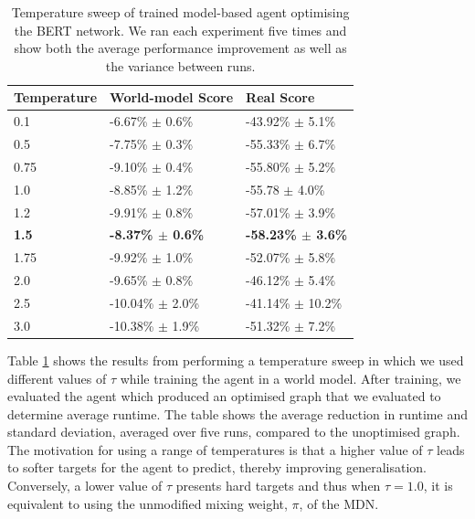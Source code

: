\begin{table}[htbp]
  \centering
  \begin{tabular}{@{}lll@{}}
  \toprule
  Temperature  & World-model Score        & Real Score                \\ \midrule
  0.1          & -6.67\% $\pm$ 0.6\%          & -43.92\% $\pm$ 5.1\%         \\
  0.5          & -7.75\% $\pm$ 0.3\%          & -55.33\% $\pm$ 6.7\%         \\
  0.75         & -9.10\% $\pm$ 0.4\%          & -55.80\% $\pm$ 5.2\%         \\
  1.0          & -8.85\% $\pm$ 1.2\%          & -55.78 $\pm$ 4.0\%           \\
  1.2          & -9.91\% $\pm$ 0.8\%          & -57.01\% $\pm$ 3.9\%         \\
  \textbf{1.5} & \textbf{-8.37\% $\mathbf{\pm}$ 0.6\%} & \textbf{-58.23\% $\mathbf{\pm}$ 3.6\%} \\
  1.75         & -9.92\% $\pm$ 1.0\%          & -52.07\% $\pm$ 5.8\%         \\
  2.0          & -9.65\% $\pm$ 0.8\%          & -46.12\% $\pm$ 5.4\%         \\
  2.5          & -10.04\% $\pm$ 2.0\%         & -41.14\% $\pm$ 10.2\%         \\
  3.0          & -10.38\% $\pm$ 1.9\%         & -51.32\% $\pm$ 7.2\%         \\ \bottomrule
  \end{tabular}
  \caption[Rewards using range of temperatures]{Temperature sweep of trained model-based agent optimising the BERT network. We ran each experiment five times and show both the average performance improvement as well as the variance between runs.}
  \label{table:eval:agent-temperatures}
\end{table}

Table \ref{table:eval:agent-temperatures} shows the results from performing a temperature sweep in which we used different values of $\tau$ while training the agent in a world model. After training, we evaluated the agent which produced an optimised graph that we evaluated to determine average runtime. The table shows the average reduction in runtime and standard deviation, averaged over five runs, compared to the unoptimised graph. The motivation for using a range of temperatures is that a higher value of $\tau$ leads to softer targets for the agent to predict, thereby improving generalisation. Conversely, a lower value of $\tau$ presents hard targets and thus when $\tau = 1.0$, it is equivalent to using the unmodified mixing weight, $\pi$, of the MDN.

